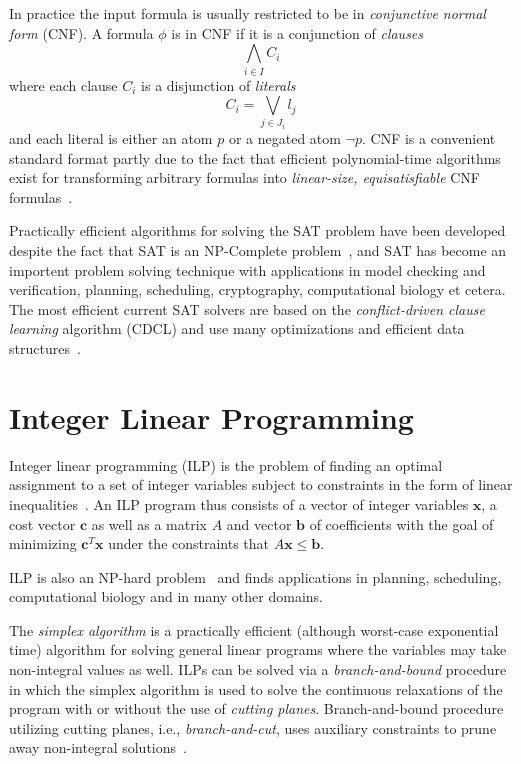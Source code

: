 \documentclass[12pt,a4paper]{article}
\begin{document}
In practice the input formula is usually restricted to be in \emph{conjunctive normal form} (CNF).
A formula $\phi$ is in CNF if it is a conjunction of \emph{clauses}
$$ \bigwedge_{i\in I} C_i $$
where each clause $C_i$ is a disjunction of \emph{literals}
$$ C_i = \bigvee_{j\in J_i} l_j $$
and each literal is either an atom $p$ or a negated atom $\neg p$.
CNF is a convenient standard format partly due to the fact that efficient polynomial-time algorithms exist for transforming arbitrary formulas into \emph{linear-size, equisatisfiable} CNF formulas~\cite{tseitin1983, DBLP:journals/jsc/PlaistedG86}.

Practically efficient algorithms for solving the SAT problem have been developed despite the fact that SAT is an NP-Complete problem~\cite{DBLP:conf/stoc/Cook71}, 
and SAT has become an importent problem solving technique with applications in model checking and verification, planning, scheduling, cryptography, computational biology et cetera.
The most efficient current SAT solvers are based on the \emph{conflict-driven clause learning} algorithm (CDCL) and use many optimizations and efficient data structures~\cite{DBLP:conf/iccad/SilvaS96, DBLP:journals/tc/Marques-SilvaS99, DBLP:conf/dac/MoskewiczMZZM01, DBLP:conf/aaai/GomesSK98, DBLP:journals/dam/GoldbergN07, ryan2004efficient, DBLP:conf/aaai/BayardoS97, DBLP:conf/sat/LewisSB05}.


\section{Integer Linear Programming}
\label{sec:ilp}
Integer linear programming (ILP) is the problem of finding an optimal assignment to a set of integer variables subject to constraints in the form of linear inequalities~\cite{DBLP:books/ph/PapadimitriouS82}.
An ILP program thus consists of a vector of integer variables $\mathbf{x}$, a cost vector $\mathbf{c}$ as well as a matrix $A$ and vector $\mathbf{b}$ of coefficients with the goal of minimizing $\mathbf{c}^T \mathbf{x}$ under the constraints that $A\mathbf{x} \leq \mathbf{b}$.

ILP is also an NP-hard problem~\cite{DBLP:conf/coco/Karp72} and finds applications in planning, scheduling, computational biology and in many other domains.

The \emph{simplex algorithm} is a practically efficient (although worst-case exponential time) algorithm for solving general linear programs where the variables may take non-integral values as well.
ILPs can be solved via a \emph{branch-and-bound} procedure in which the simplex algorithm is used to solve the continuous relaxations of the program with or without the use of \emph{cutting planes}.
Branch-and-bound procedure utilizing cutting planes, i.e., \emph{branch-and-cut}, uses auxiliary constraints to prune away non-integral solutions~\cite{DBLP:books/ph/PapadimitriouS82}.
\end{document}
